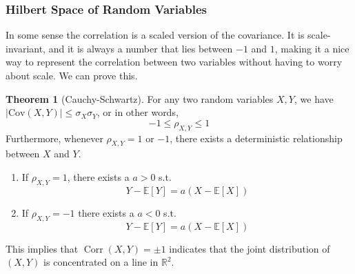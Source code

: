 \documentclass{article}
\DeclareMathOperator{\Corr}{Corr}
\theoremstyle{definition}
\newtheorem{theorem}{Theorem}[section]
\theoremstyle{remark}
\theoremstyle{definition}
\begin{document}
\subsubsection{Hilbert Space of Random Variables}

In some sense the correlation is a scaled version of the covariance. It is scale-invariant, and it is always a number that lies between $-1$ and $1$, making it a nice way to represent the correlation between two variables without having to worry about scale. We can prove this. 

\begin{theorem}[Cauchy-Schwartz]
For any two random variables $X, Y$, we have $|\mathrm{Cov}(X, Y)| \leq \sigma_X \sigma_Y$, or in other words, 
\[-1 \leq \rho_{X, Y} \leq 1\]
Furthermore, whenever $\rho_{X, Y} = 1$ or $-1$, there exists a deterministic relationship between $X$ and $Y$. 
\begin{enumerate}
    \item If $\rho_{X, Y} = 1$, there exists a $a > 0$ s.t. 
    \[Y - \mathbb{E}[Y] = a (X - \mathbb{E}[X])\]
    \item If $\rho_{X, Y} = -1$ there exists a $a < 0$ s.t. 
    \[Y - \mathbb{E}[Y] = a (X - \mathbb{E}[X])\]
\end{enumerate}
This implies that $\Corr(X, Y) = \pm 1$ indicates that the joint distribution of $(X, Y)$ is concentrated on a line in $\mathbb{R}^2$. 
\end{theorem}
\end{document}
